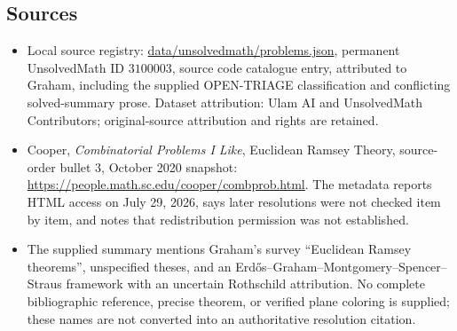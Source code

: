 \documentclass[11pt]{article}
\begin{document}
\subsection{Sources}
\begin{itemize}
\item Local source registry: \url{data/unsolvedmath/problems.json}, permanent UnsolvedMath ID $3100003$, source code catalogue entry, attributed to Graham, including the supplied OPEN-TRIAGE classification and conflicting solved-summary prose. Dataset attribution: Ulam AI and UnsolvedMath Contributors; original-source attribution and rights are retained.
\item Cooper, \emph{Combinatorial Problems I Like}, Euclidean Ramsey Theory, source-order bullet 3, October 2020 snapshot: \url{https://people.math.sc.edu/cooper/combprob.html}. The metadata reports HTML access on July 29, 2026, says later resolutions were not checked item by item, and notes that redistribution permission was not established.
\item The supplied summary mentions Graham's survey ``Euclidean Ramsey theorems'', unspecified theses, and an Erd\H os--Graham--Montgomery--Spencer--Straus framework with an uncertain Rothschild attribution. No complete bibliographic reference, precise theorem, or verified plane coloring is supplied; these names are not converted into an authoritative resolution citation.
\end{itemize}
\end{document}
